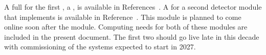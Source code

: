 \documentclass[../main-v1.tex]{subfiles}
\begin{document}
A full  for the first , a ,
is available in References~\cite{Abi:2020evt, DUNE:2020lwj, Abi:2020oxb, Abi:2020loh}.  %
 A  for a second detector module that implements  is available in Reference~\cite{bib:spvd-cdr-edms}. This module is planned to come online soon after the  module. Computing needs for both of these modules are included in the present document. 
The first two  should go live late in this decade with commissioning of the  %
systems %
expected to start in 2027. %

\end{document}
